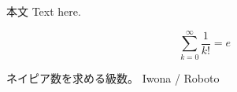 \documentclass[a4paper,11pt]{ltjsarticle}
\begin{document}
本文 Text here.
 
\[\sum_{k=0}^{\infty} \frac{1}{k!} = e\]
 
ネイピア数を求める級数。
\textrm{Iwona} / \textsf{Roboto}
\end{document}

